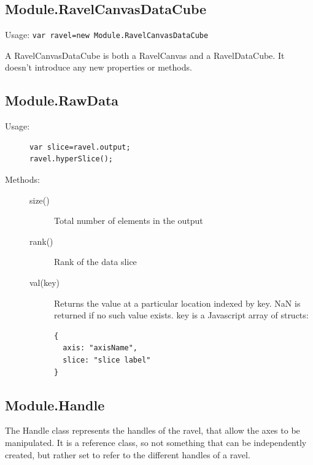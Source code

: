 \documentclass{article}
\begin{document}
\subsection{Module.RavelCanvasDataCube}

Usage: \verb+var ravel=new Module.RavelCanvasDataCube+

A RavelCanvasDataCube is both a RavelCanvas and a RavelDataCube. It
doesn't introduce any new properties or methods.

\subsection{Module.RawData}

\begin{description}
\item[Usage:]\mbox{}
\begin{verbatim}
var slice=ravel.output;
ravel.hyperSlice();
\end{verbatim}

\item[Methods:]\mbox{}
  \begin{description}
  \item[size()] Total number of elements in the output
  \item[rank()] Rank of the data slice
  \item[val(key)] Returns the value at a particular location indexed
    by key. NaN is returned if no such value exists. key is a
    Javascript array of structs:
\begin{verbatim}
{
  axis: "axisName",
  slice: "slice label"
}
\end{verbatim}
  \end{description}
\end{description}  

\subsection{Module.Handle}
  
The Handle class represents the handles of the ravel, that allow the
axes to be manipulated. It is a reference class, so not something that
can be independently created, but rather set to refer to the different
handles of a ravel.
\end{document}
